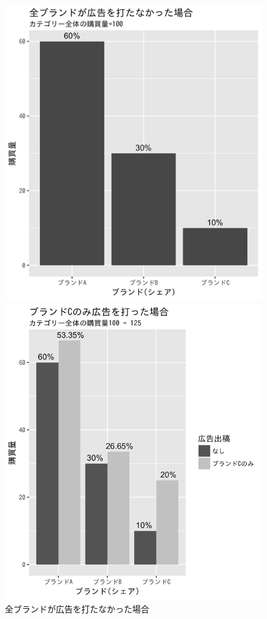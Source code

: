 \documentclass[11pt]{jsarticle}
\begin{document}
\begin{figure}[htbp]
 \centering
\begin{minipage}{0.46\columnwidth}
 \centering
 \includegraphics[width=\columnwidth]{./fig/3-4-3_no_ad.png}
 \caption{全ブランドが広告を打たなかった場合}
 \label{fig:3-4-3_no_ad}
\end{minipage}
\begin{minipage}{0.5\columnwidth}
 \centering
  \includegraphics[width=\columnwidth]{./fig/3-4-3_c_ad.png}

\end{minipage}
\end{figure}
\end{document}
